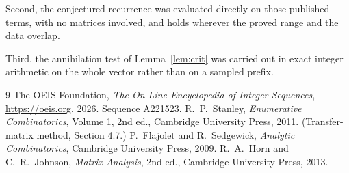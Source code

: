 \documentclass[11pt,a4paper]{article}
\theoremstyle{plain}
\theoremstyle{definition}
\begin{document}
Second, the conjectured recurrence was evaluated directly on those published terms, with no
matrices involved, and holds wherever the proved range and the data overlap.

Third, the annihilation test of Lemma~\ref{lem:crit} was carried out in exact integer
arithmetic on the whole vector rather than on a sampled prefix.

\begin{thebibliography}{9}
 The OEIS Foundation, \emph{The On-Line Encyclopedia of Integer
Sequences}, \url{https://oeis.org}, 2026. Sequence A221523.
 R.~P.~Stanley, \emph{Enumerative Combinatorics}, Volume 1, 2nd ed.,
Cambridge University Press, 2011. (Transfer-matrix method, Section 4.7.)
 P.~Flajolet and R.~Sedgewick, \emph{Analytic Combinatorics}, Cambridge
University Press, 2009.
 R.~A.~Horn and C.~R.~Johnson, \emph{Matrix Analysis}, 2nd ed., Cambridge
University Press, 2013.
\end{thebibliography}
\end{document}
